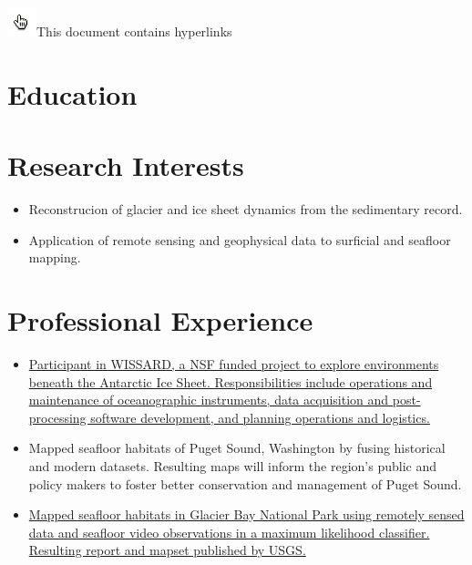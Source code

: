 \documentclass{cv_TOH}
\newcommand{\Pointer}{\includegraphics[scale=0.5]{pointer.png}}%
\begin{document}
\centerline{\Pointer This document contains hyperlinks}

\section{Education}

\section{Research Interests}
\begin{itemize}
\item Reconstrucion of glacier and ice sheet dynamics from the sedimentary record.
\item Application of remote sensing and geophysical data to surficial and seafloor mapping. 
\end{itemize}

\section{Professional Experience}


\begin{itemize}
\item \href{http://www.wissard.org}{Participant in WISSARD, a NSF funded project to explore environments beneath the Antarctic Ice Sheet. Responsibilities include operations and maintenance of oceanographic instruments, data acquisition and post-processing software development, and planning operations and logistics.}
\item Mapped seafloor habitats of Puget Sound, Washington by fusing historical and modern datasets. Resulting maps will inform the region's public and policy makers to foster better conservation and management of Puget Sound.
\item \href{http://pubs.usgs.gov/sim/3253/}{Mapped seafloor habitats in Glacier Bay National Park using remotely sensed data and seafloor video observations in a maximum likelihood classifier. Resulting report and mapset published by USGS.}
\end{itemize}
\end{document}
